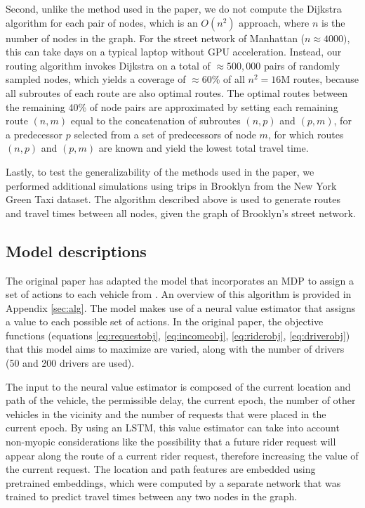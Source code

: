 Second, unlike the method used in the paper, we do not compute the Dijkstra algorithm for each pair of nodes, which is an $O(n^2)$ approach, where $n$ is the number of nodes in the graph. For the street network of Manhattan ($n \approx 4000)$, this can take days on a typical laptop without GPU acceleration. Instead, our routing algorithm invokes Dijkstra on a total of $\approx 500,000$ pairs of randomly sampled nodes, which yields a coverage of $\approx 60\%$ of all $n^2=16$M routes, because all subroutes of each route are also optimal routes. The optimal routes between the remaining 40\% of node pairs are approximated by setting each remaining route $(n,m)$ equal to the concatenation of subroutes $(n,p)$ and $(p,m)$, for a predecessor $p$ selected from a set of predecessors of node $m$, for which routes $(n,p)$ and $(p,m)$ are known and yield the lowest total travel time.

Lastly, to test the generalizability of the methods used in the paper, we performed additional simulations using trips in Brooklyn from the New York Green Taxi dataset. The algorithm described above is used to generate routes and travel times between all nodes, given the graph of Brooklyn's street network.

\subsection{Model descriptions}
The original paper has adapted the model that incorporates an MDP to assign a set of actions to each vehicle from \cite{shah_neural_2019}. An overview of this algorithm is provided in Appendix \ref{sec:alg}. The model makes use of a neural value estimator that assigns a value to each possible set of actions. In the original paper, the objective functions (equations \ref{eq:requestobj}, \ref{eq:incomeobj}, \ref{eq:riderobj}, \ref{eq:driverobj}) that this model aims to maximize are varied, along with the number of drivers (50 and 200 drivers are used).

The input to the neural value estimator \cite{shah_neural_2019} is composed of the current location and path of the vehicle, the permissible delay, the current epoch, the number of other vehicles in the vicinity and the number of requests that were placed in the current epoch. By using an LSTM, this value estimator can take into account non-myopic considerations like the possibility that a future rider request will appear along the route of a current rider request, therefore increasing the value of the current request. The location and path features are embedded using pretrained embeddings, which were computed by a separate network that was trained to predict travel times between any two nodes in the graph.

